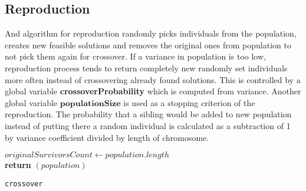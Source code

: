 \documentclass{article}
\begin{document}
	\subsection{Reproduction}
		And algorithm for reproduction randomly picks individuals from the population, creates new feasible solutions and removes the original ones from population to not pick them again for crossover.
		If a variance in population is too low, reproduction process tends to return completely new randomly set individuals more often instead of crossovering already found solutions. This is controlled by a global variable \textbf{crossoverProbability} which is computed from variance.
		Another global variable $\textbf{populationSize}$ is used as a stopping criterion of the reproduction. The probability that a sibling would be added to new population instead of putting there a random individual is calculated as a subtraction of 1 by variance coefficient divided by length of chromosome. 
		\begin{center}
			\begin{minipage}{1\linewidth} %
				\begin{algorithm}[H]
					\hrulefill
					\medskip

					$originalSurvivorsCount \gets population.length$\\
					{\bf return} $(population)$
					\caption{\texttt{crossover}} %
					\label{alg:crossover}   %
				\end{algorithm}
			\end{minipage}
		\end{center}
\end{document}
